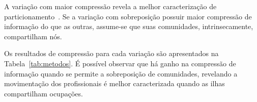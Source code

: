 \documentclass[
  article,
  11pt,
  a4paper,
  english,
  brazil,
  sumario=tradicional]{abntex2}
\begin{document}
A variação com maior compressão revela a melhor caracterização de particionamento~\cite{Viamontes_Esquivel2011-it,Rosvall2011-yi,Edler2017-kt}. Se a variação com sobreposição possuir maior compressão de informação do que as outras, assume-se que suas comunidades, intrinsecamente, compartilham nós.

Os resultados de compressão para cada variação são apresentados na Tabela~\ref{tab:metodos}. É possível observar que há ganho na compressão de informação quando se permite a sobreposição de comunidades, revelando a movimentação dos profissionais é melhor caracterizada quando as ilhas compartilham ocupações.

\end{document}
